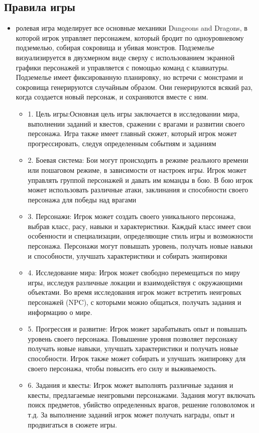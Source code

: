 \subsection{Правила игры}
 \begin{itemize}
 	\item ролевая игра моделирует все основные механики Dungeons and Dragons, в которой игрок управляет персонажем, который бродит по одноуровневому подземелью, собирая сокровища и убивая монстров. Подземелье визуализируется в двухмерном виде сверху с использованием экранной графики персонажей и управляется с помощью команд с клавиатуры. Подземелье имеет фиксированную планировку, но встречи с монстрами и сокровища генерируются случайным образом. Они генерируются всякий раз, когда создается новый персонаж, и сохраняются вместе с ним.
 	\begin{itemize}
 		\item 1. Цель игры:Основная цель игры заключается в исследовании мира, выполнении заданий и квестов, сражении с врагами и развитии своего персонажа. Игра также имеет главный сюжет, который игрок может прогрессировать, следуя определенным событиям и заданиям
 		\item 2. Боевая система:  Бои могут происходить в режиме реального времени или пошаговом режиме, в зависимости от настроек игры. Игрок может управлять группой персонажей и давать им команды в бою. В бою игрок может использовать различные атаки, заклинания и способности своего персонажа для победы над врагами
 		\item 3. Персонажи: Игрок может создать своего уникального персонажа, выбрав класс, расу, навыки и характеристики. Каждый класс имеет свои особенности и специализации, определяющие стиль игры и возможности персонажа. Персонажи могут повышать уровень, получать новые навыки и способности, улучшать характеристики и собирать экипировки
 		\item 4. Исследование мира: Игрок может свободно перемещаться по миру игры, исследуя различные локации и взаимодействуя с окружающими объектами. Во время исследования игрок может встретить неигровых персонажей (NPC), с которыми можно общаться, получать задания и информацию о мире.
 		\item 5. Прогрессия и развитие: Игрок может зарабатывать опыт и повышать уровень своего персонажа. Повышение уровня позволяет персонажу получать новые навыки, улучшать характеристики и получать новые способности. Игрок также может собирать и улучшать экипировку для своего персонажа, чтобы повысить его силу и выживаемость.
 		\item 6. Задания и квесты: Игрок может выполнять различные задания и квесты, предлагаемые неигровыми персонажами. Задания могут включать поиск предметов, убийство определенных врагов, решение головоломок и т.д. За выполнение заданий игрок может получать награды, опыт и продвигаться в сюжете игры.
 	\end{itemize}
 \end{itemize}
 
